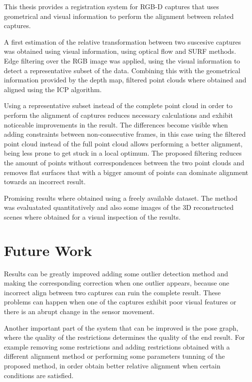 

This thesis provides a registration system for RGB-D captures that uses geometrical and visual information 
to perform the alignment between related captures.  

A first estimation of the relative transformation between two suscesive captures was obtained using 
visual information, using optical flow and SURF methods. Edge filtering over the RGB image was applied, 
using the visual information to detect a representative subset 
of the data. Combining this with the geometrical information provided by the depth map, filtered point clouds 
where obtained and aligned using the ICP algorithm. 

Using a representative subset instead of the complete point cloud in order to perform the alignment of captures 
reduces necessary calculations and exhibit noticeable improvements in the result. The differences become visible 
when adding constraints between non-consecutive frames, in this case using the filtered point cloud instead of 
the full point cloud allows performing a better alignment, being less prone to get stuck in a local optimum. The 
proposed filtering reduces the amount of points without correspondences between the two point clouds and removes 
flat surfaces that with a bigger amount of points can dominate alignment towards an incorrect result.


Promising results where obtained using a freely available dataset. The method was evaluatated quantitatively and 
also some images of the 3D reconstructed scenes where obtained for a visual inspection of the results.

\section{Future Work}

  Results can be greatly improved adding some outlier detection method and making the corresponding correction when one 
outlier appears, because one incorrect align between two captures can ruin the complete result. These problems can happen 
when one of the captures exhibit poor visual features or there is an abrupt change in the sensor movement. 

  Another important part of the system that can be improved is the pose graph, where the quality of the restrictions 
determines the quality of the end result. For example removing some restrictions and adding restrictions obtained with a 
different alignment method or performing some parameters tunning of the proposed method, in 
order obtain better relative alignment when certain conditions are satisfied.

